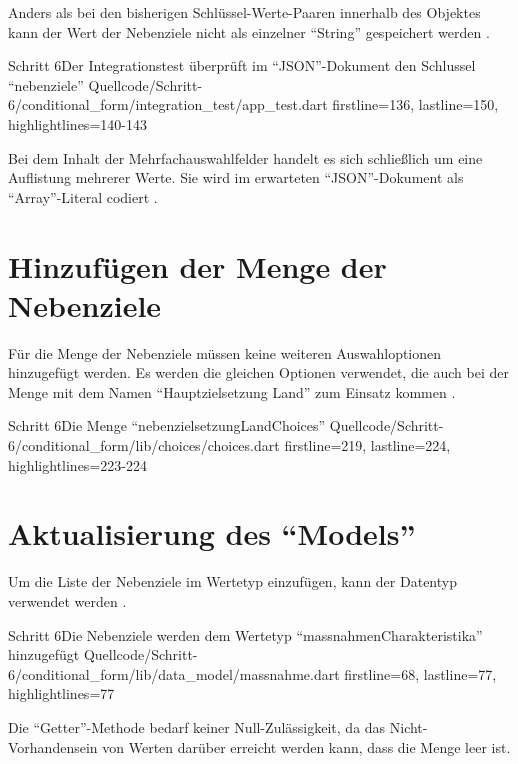 Anders als bei den bisherigen Schlüssel-Werte-Paaren innerhalb des Objektes  kann der Wert der Nebenziele nicht als einzelner \enquote{String} gespeichert werden \Lst{\ref{lst:Schritt6expectedJson}}.

\begin{alexlisting}{Schritt 6}{Der Integrationstest überprüft im \enquote{JSON}-Dokument den Schlussel \enquote{nebenziele}}
  {Quellcode/Schritt-6/conditional_form/integration_test/app_test.dart}
  {firstline=136, lastline=150, highlightlines={140-143}}
  \label{lst:Schritt6expectedJson}
\end{alexlisting}

Bei dem Inhalt der Mehrfachauswahlfelder handelt es sich schließlich um eine Auflistung mehrerer Werte.
Sie wird im erwarteten \enquote{JSON}-Dokument als \enquote{Array}-Literal codiert .



\section{Hinzufügen der Menge der Nebenziele}

Für die Menge der Nebenziele müssen keine weiteren Auswahloptionen hinzugefügt werden.
Es werden die gleichen Optionen verwendet,
die auch bei der Menge  mit dem Namen \enquote{Hauptzielsetzung Land} zum Einsatz kommen .

\begin{alexlisting}{Schritt 6}{Die Menge \enquote{nebenzielsetzungLandChoices}}
  {Quellcode/Schritt-6/conditional_form/lib/choices/choices.dart}
  {firstline=219, lastline=224, highlightlines={223-224}}
  \label{lst:Schritt6nebenzielsetzungLandChoices}
\end{alexlisting}

\section{Aktualisierung des \enquote{Models}}

Um die Liste der Nebenziele im Wertetyp  einzufügen,
kann der Datentyp  verwendet werden .
\begin{alexlisting}{Schritt 6}{Die Nebenziele werden dem Wertetyp \enquote{massnahmenCharakteristika} hinzugefügt}
  {Quellcode/Schritt-6/conditional_form/lib/data_model/massnahme.dart}
  {firstline=68, lastline=77, highlightlines={77}}
  \label{lst:Schritt6MassnahmenCharakteristika}
\end{alexlisting}
Die \enquote{Getter}-Methode  bedarf keiner Null-Zulässigkeit,
da das Nicht-Vorhandensein von Werten darüber erreicht werden kann,
dass die Menge leer ist.




